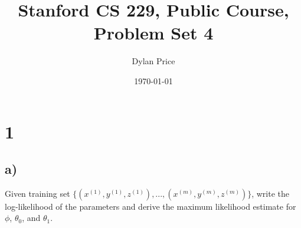 \documentclass[11pt]{article}
\begin{document}
\title{Stanford CS 229, Public Course, Problem Set 4}
\date{\today}
\author{Dylan Price}
\maketitle 

\newcommand{\xith}[0]{x^{(i)}}
\newcommand{\yith}[0]{y^{(i)}}
\newcommand{\zith}[0]{z^{(i)}}

\section*{1}

\subsection*{a)}
Given training set $\{(x^{(1)},y^{(1)},z^{(1)}),...,(x^{(m)},y^{(m)},z^{(m)})\}$, write the log-likelihood of the parameters and derive the maximum likelihood estimate for $\phi$, $\theta_0$, and $\theta_1$. \\
\end{document}
